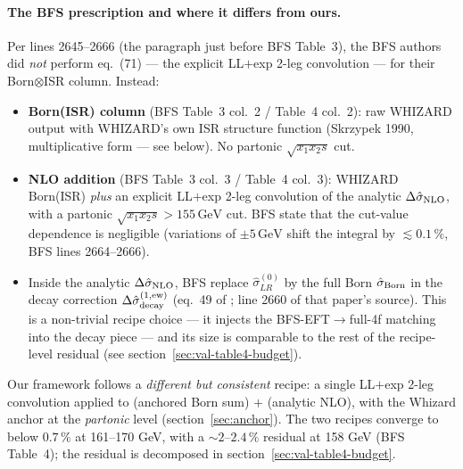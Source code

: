 \documentclass[11pt,a4paper]{article}
\begin{document}
\paragraph{The BFS prescription and where it differs from ours.}
Per \cite{BFSnlo} lines 2645--2666 (the paragraph just before BFS
Table~3), the BFS authors did \emph{not} perform eq.~(71) — the
explicit LL$+$exp 2-leg convolution — for their Born$\otimes$ISR
column. Instead:
\begin{itemize}
\item \textbf{Born(ISR) column} (BFS Table~3 col.~2 / Table~4 col.~2):
  raw WHIZARD output with WHIZARD's own ISR structure function (Skrzypek
  1990, multiplicative form — see below). No partonic
  $\sqrt{x_1x_2 s}$ cut.
\item \textbf{NLO addition} (BFS Table~3 col.~3 / Table~4 col.~3):
  WHIZARD Born(ISR) \emph{plus} an explicit LL$+$exp 2-leg convolution
  of the analytic $\Delta\hat\sigma_{\rm NLO}$, with a partonic
  $\sqrt{x_1 x_2 s} > 155\,\text{GeV}$ cut. BFS state that the
  cut-value dependence is negligible (variations of $\pm 5\,\text{GeV}$
  shift the integral by $\lesssim 0.1\,\%$, BFS lines 2664--2666).
\item Inside the analytic $\Delta\hat\sigma_{\rm NLO}$, BFS replace
  $\hat\sigma_{LR}^{(0)}$ by the full Born $\hat\sigma_{\rm Born}$ in
  the decay correction $\Delta\hat\sigma_{\rm decay}^{(1,\rm ew)}$
  (eq.~49 of \cite{BFSnlo}; line 2660 of that paper's source). This is
  a non-trivial recipe choice — it injects the BFS-EFT$\to$full-4f
  matching into the decay piece — and its size is comparable to the
  rest of the recipe-level residual (see
  section~\ref{sec:val-table4-budget}).
\end{itemize}
Our framework follows a \emph{different but consistent} recipe: a
single LL$+$exp 2-leg convolution applied to (anchored Born sum) $+$
(analytic NLO), with the Whizard anchor at the \emph{partonic} level
(section~\ref{sec:anchor}). The two recipes converge to below
$0.7\,\%$ at 161--170 GeV, with a $\sim\!2$--$2.4\,\%$ residual at
158 GeV (BFS Table~4); the residual is decomposed in
section~\ref{sec:val-table4-budget}.
\end{document}
